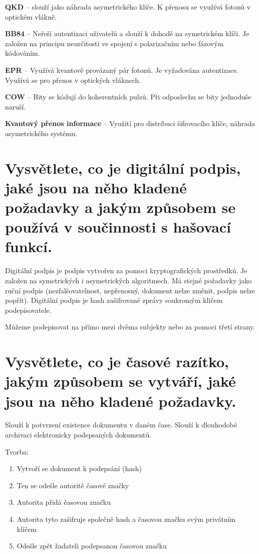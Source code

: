 \textbf{QKD} -- slouží jako náhrada asymetrického klíče. K přenosu se využívá fotonů v optickém vlákně.

\textbf{BB84} -- Neřeší autentizaci uživatelů a slouží k dohodě na symetrickém klíči. Je založen na principu neurčitosti ve spojení s polarizačním nebo fázovým kódováním.

\textbf{EPR} -- Využívá kvantově provázaný pár fotonů. Je vyžadována autentizace. Využívá se pro přenos v optických vláknech.

\textbf{COW} -- Bity se kódují do koherentních pulzů. Při odposlechu se bity jednoduše naruší.

\textbf{Kvantový přenos informace} --  Využití pro distribuci šifrovacího klíče, náhrada asymetrického systému.

\section{Vysvětlete, co je digitální podpis, jaké jsou na něho kladené požadavky a jakým způsobem se používá v součinnosti s hašovací funkcí.}

Digitální podpis je podpis vytvořen za pomoci kryptografických prostředků. Je založen na symetrických i asymetrických algoritmech. Má stejné požadavky jako ruční podpis (nezfalšovatelnost, nepřenosný, dokument nelze změnit, podpis nelze popřít). Digitální podpis je hash zašifrované zprávy soukromým klíčem podepisovatele. 

Můžeme podepisovat na přímo mezi dvěma subjekty nebo za pomoci třetí strany. 

\section{Vysvětlete, co je časové razítko, jakým způsobem se vytváří, jaké jsou na něho kladené požadavky.}

Slouží k potvrzení existence dokumentu v daném čase. Slouží k dlouhodobé archivaci elektronicky podepsaných dokumentů. 

Tvorba:
\begin{enumerate}
    \item Vytvoří se dokument k podepsání (hash)
    \item Ten se odešle autoritě časové značky
    \item Autorita přidá časovou značku
    \item Autorita tyto zašifruje společně hash a časovou značku svým privátním klíčem
    \item Odešle zpět žadateli podepsanou časovou značku
\end{enumerate}

